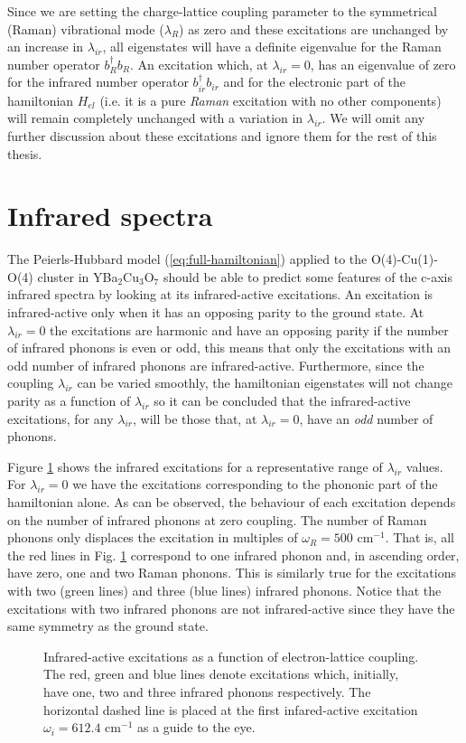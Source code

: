 Since we are setting the charge-lattice coupling parameter to the symmetrical (Raman) vibrational mode ($\lambda_R$) as zero and these excitations are unchanged by an increase in $\lambda_{ir}$, all eigenstates will have a definite eigenvalue for the Raman number operator $b_R^\dagger b_R$. 
An excitation which, at $\lambda_{ir}=0$, has an eigenvalue of zero for the infrared number operator $b_{ir}^\dagger b_{ir}$ and for the electronic part of the hamiltonian $H_{el}$ (i.e. it is a pure \textit{Raman} excitation with no other components) will remain completely unchanged with a variation in $\lambda_{ir}$.
We will omit any further discussion about these excitations and ignore them for the rest of this thesis. 


\section{Infrared spectra}
\label{sec:irSpectra}

The Peierls-Hubbard model (\ref{eq:full-hamiltonian}) applied to the O(4)-Cu(1)-O(4) cluster in YBa$_2$Cu$_3$O$_7$ should be able to predict some features of the c-axis infrared spectra by looking at its infrared-active excitations.
An excitation is infrared-active only when it has an opposing parity to the ground state.
At $\lambda_{ir}=0$ the excitations are harmonic and have an opposing parity if the number of infrared phonons is even or odd, this means that only the excitations with an odd number of infrared phonons are infrared-active.
Furthermore, since the coupling $\lambda_{ir}$ can be varied smoothly, the hamiltonian eigenstates will not change parity as a function of $\lambda_{ir}$ so it can be concluded that the infrared-active excitations, for any $\lambda_{ir}$, will be those that, at $\lambda_{ir}=0$, have an \textit{odd} number of phonons.

Figure \ref{fig:irSpectra} shows the infrared excitations for a representative range of $\lambda_{ir}$ values.
For $\lambda_{ir}=0$ we have the excitations corresponding to the phononic part of the hamiltonian alone.
As can be observed, the behaviour of each excitation depends on the number of infrared phonons at zero coupling.
The number of Raman phonons only displaces the excitation in multiples of $\omega_R=500$ cm$^{-1}$.
That is, all the red lines in Fig. \ref{fig:irSpectra} correspond to one infrared phonon and, in ascending order, have zero, one and two Raman phonons.
This is similarly true for the excitations with two (green lines) and three (blue lines) infrared phonons.
Notice that the excitations with two infrared phonons are not infrared-active since they have the same symmetry as the ground state.
%
\begin{figure}[ht]
  \centering
  
  \caption[Infrared-active excitations as a function of electron-lattice coupling.]
  {Infrared-active excitations as a function of electron-lattice coupling.
  The red, green and blue lines denote excitations which, initially, have one, two and three infrared phonons respectively.
  The horizontal dashed line is placed at the first infared-active excitation $\omega_i=612.4$ cm$^{-1}$ as a guide to the eye.}
  \label{fig:irSpectra}
\end{figure}

